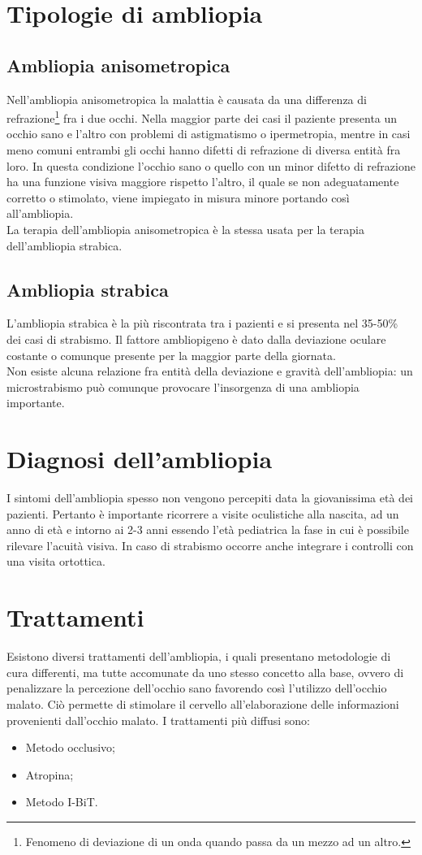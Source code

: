 \documentclass[12pt,a4paper,openright,twoside]{book}
\begin{document}
	\section{Tipologie di ambliopia}
	\subsection{Ambliopia anisometropica}
	Nell'ambliopia anisometropica la malattia è causata da una differenza di refrazione\footnote{Fenomeno di deviazione di un onda quando passa da un mezzo ad un altro.} fra i due occhi. Nella maggior parte dei casi il paziente presenta un occhio sano e l'altro con problemi di astigmatismo o ipermetropia, mentre in casi meno comuni entrambi gli occhi hanno difetti di refrazione di diversa entità fra loro.
	In questa condizione l'occhio sano o quello con un minor difetto di refrazione ha una funzione visiva maggiore rispetto l'altro, il quale se non adeguatamente corretto o stimolato, viene impiegato in misura minore portando così all'ambliopia.\\
	La terapia dell'ambliopia anisometropica è la stessa usata per la terapia dell'ambliopia strabica.  \cite{strabpedr}
	\subsection{Ambliopia strabica} 
	L'ambliopia strabica è la più riscontrata tra i pazienti e si presenta nel 35-50\% dei casi di strabismo. Il fattore ambliopigeno è dato dalla deviazione oculare costante o comunque presente per la
	maggior parte della giornata. \\
	Non esiste alcuna relazione fra entità della deviazione e gravità dell’ambliopia: un microstrabismo
	può comunque provocare l’insorgenza di una ambliopia importante. 
    \section{Diagnosi dell'ambliopia}
    I sintomi dell'ambliopia spesso non vengono percepiti data la giovanissima età dei pazienti. Pertanto è importante ricorrere a visite oculistiche alla nascita, ad un anno di età e intorno ai 2-3 anni essendo l'età pediatrica la fase in cui è possibile rilevare l'acuità visiva. In caso di strabismo occorre anche integrare i controlli con una visita ortottica.
    \section{Trattamenti}
    Esistono diversi trattamenti dell'ambliopia, i quali presentano metodologie di cura differenti, ma tutte accomunate da uno stesso concetto alla base, ovvero di penalizzare la percezione dell'occhio sano favorendo così l'utilizzo dell'occhio malato. Ciò permette di stimolare il cervello all'elaborazione delle informazioni
    provenienti dall'occhio malato. I trattamenti più diffusi sono:
    \begin{itemize}
    	\item Metodo occlusivo;
    	\item Atropina;
    	\item Metodo I-BiT.
    \end{itemize}
\end{document}
